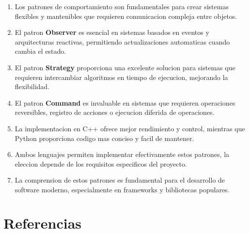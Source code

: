\documentclass[11pt,a4paper]{article}
\begin{document}
\begin{enumerate}
    \item Los patrones de comportamiento son fundamentales para crear sistemas flexibles y mantenibles que requieren comunicacion compleja entre objetos.
    
    \item El patron \textbf{Observer} es esencial en sistemas basados en eventos y arquitecturas reactivas, permitiendo actualizaciones automaticas cuando cambia el estado.
    
    \item El patron \textbf{Strategy} proporciona una excelente solucion para sistemas que requieren intercambiar algoritmos en tiempo de ejecucion, mejorando la flexibilidad.
    
    \item El patron \textbf{Command} es invaluable en sistemas que requieren operaciones reversibles, registro de acciones o ejecucion diferida de operaciones.
    
    \item La implementacion en C++ ofrece mejor rendimiento y control, mientras que Python proporciona codigo mas conciso y facil de mantener.
    
    \item Ambos lenguajes permiten implementar efectivamente estos patrones, la eleccion depende de los requisitos especificos del proyecto.
    
    \item La comprension de estos patrones es fundamental para el desarrollo de software moderno, especialmente en frameworks y bibliotecas populares.
\end{enumerate}

\section{Referencias}
\end{document}
